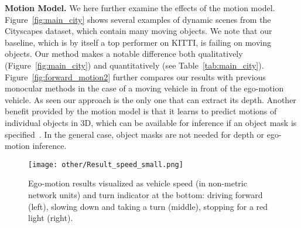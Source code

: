 \documentclass[10pt,twocolumn,letterpaper]{article}
\begin{document}
\textbf{Motion Model.}
We here further examine the effects of the motion model. Figure~\ref{fig:main_city} shows several examples of dynamic scenes from the Cityscapes dataset, which contain many moving objects. We note that our baseline, which is by itself a top performer on KITTI, is failing on moving objects. Our method makes a notable difference both qualitatively (Figure~\ref{fig:main_city}) and quantitatively (see Table~\ref{tab:main_city}).   
Figure~\ref{fig:forward_motion2} further compares our results with previous monocular methods in the case of a moving vehicle in front of the ego-motion vehicle. As seen our approach is the only one that can extract its depth.
Another benefit provided by the motion model is that it learns to predict motions of individual objects in 3D, which can be available for inference if an object mask is specified~\cite{casser2019depth}. In the general case, object masks are not needed for depth or ego-motion inference.

\begin{table} [h!]
\centering
{}
\caption{Quantitative evaluation of odometry on the KITTI Odometry test sequences. Methods using more information than a set of rolling 3-frames are marked (*). Models that are trained on a different part of the dataset are marked ().}
\label{fig:kitti_vo}
\end{table}

\begin{figure*}[t]
    \centering        
    \texttt{[image: other/Result\_speed\_small.png]}
    \caption{Ego-motion results visualized as vehicle speed (in non-metric network units) and turn indicator at the bottom: driving forward (left), slowing down and taking a turn (middle), stopping for a red light (right).}
    \label{fig:ego-res}
\end{figure*}
\end{document}
